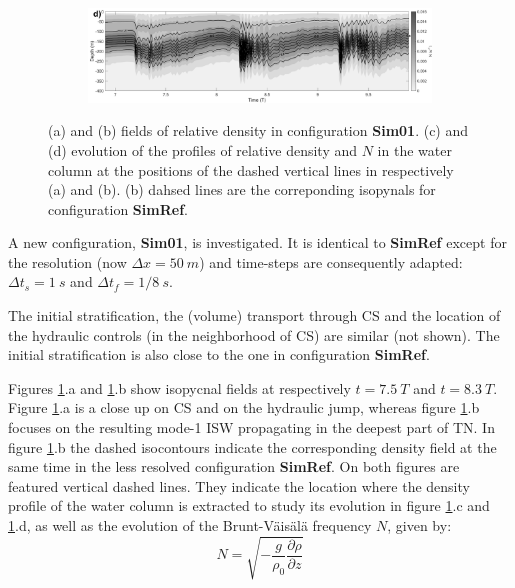 \begin{figure}[!t]
  \begin{subfigure}{1\linewidth}
  \includegraphics[width=\textwidth]{./papier2D/NrhoTZ_50mNH_535.png}
  \end{subfigure}
  \caption{(a) and (b) fields of relative density in configuration \textbf{Sim01}. (c) and (d) evolution of the profiles of relative density and $N$ in the water column at the positions of the dashed vertical lines in respectively (a) and (b). (b) dahsed lines are the correponding isopynals for configuration \textbf{SimRef}.}
  \label{fig50mtvd}
\end{figure}

 
  
 
A new configuration, \textbf{Sim01}, is investigated. It is identical to \textbf{SimRef} except for the resolution (now $\Delta x = 50\ m$) and time-steps are consequently adapted: $\Delta t_s = 1\ s$ and $\Delta t_f = 1/8\ s$. 

The initial stratification, the (volume) transport through CS and the location of the hydraulic controls (in the neighborhood of CS) are similar (not shown). The initial stratification is also close to the one in configuration \textbf{SimRef}.

Figures \ref{fig50mtvd}.a and \ref{fig50mtvd}.b show isopycnal fields at respectively $t = 7.5\ T$ and $t = 8.3\ T$. Figure \ref{fig50mtvd}.a is a close up on CS and on the hydraulic jump, whereas figure \ref{fig50mtvd}.b focuses on the resulting mode-1 ISW propagating in the deepest part of TN. In figure \ref{fig50mtvd}.b the dashed isocontours indicate the corresponding density field at the same time in the less resolved configuration \textbf{SimRef}. On both figures are featured vertical dashed lines. They indicate the location where the density profile of the water column is extracted to study its evolution in figure \ref{fig50mtvd}.c and \ref{fig50mtvd}.d, as well as the evolution of the Brunt-Väisälä frequency $N$,  given by:
\begin{equation}
N=\sqrt{ - \frac{g}{\rho_0} \frac{\partial \rho}{\partial z}}
\label{eqN}
\end{equation}

